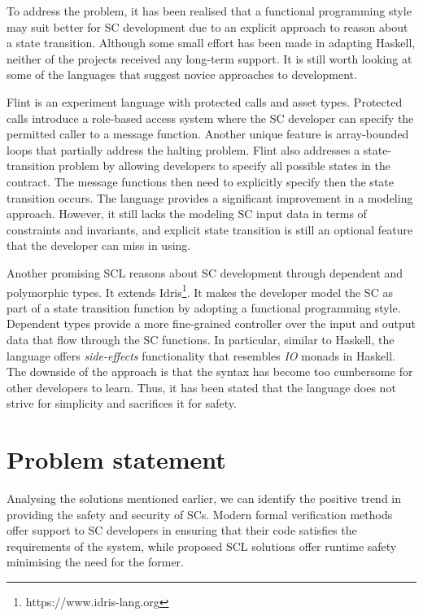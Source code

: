 \documentclass[oneside]{ecsproject}     %
\begin{document}
To address the problem, it has been realised that a functional programming style may suit better for SC development due to
an explicit approach to reason about a state transition. Although some small effort has been made in adapting Haskell,
neither of the projects received any long-term support. It is still worth looking at some of the languages that suggest novice approaches to development. 

Flint is an experiment language with protected calls and asset types\cite{flint}. Protected calls introduce a role-based access system
where the SC developer can specify the permitted caller to a message function. Another unique feature is array-bounded loops
that partially address the halting problem. Flint also addresses a state-transition problem by allowing developers to specify
all possible states in the contract. The message functions then need to explicitly specify then the state transition occurs.
The language provides a significant improvement in a modeling approach. However, it still lacks the modeling SC input data in terms
of constraints and invariants, and explicit state transition is still an optional feature that the developer can miss in using.

Another promising SCL reasons about SC development through dependent and polymorphic types\cite{idris}. It extends Idris\footnote{https://www.idris-lang.org}.
It makes the developer model the SC as part of a state transition function by adopting a functional programming style. Dependent types provide a more
fine-grained controller over the input and output data that flow through the SC functions. In particular, similar to Haskell, the language offers \textit{side-effects} 
functionality that resembles \textit{IO} monads in Haskell. The downside of the approach is that the syntax has become too cumbersome for other developers to learn. Thus,
it has been stated that the language does not strive for simplicity and sacrifices it for safety.


\section{Problem statement}

Analysing the solutions mentioned earlier, we can identify the positive trend in providing the safety and security of SCs.
Modern formal verification methods offer support to SC developers in ensuring that their code satisfies the requirements of the system, while
proposed SCL solutions offer runtime safety minimising the need for the former.
\end{document}

